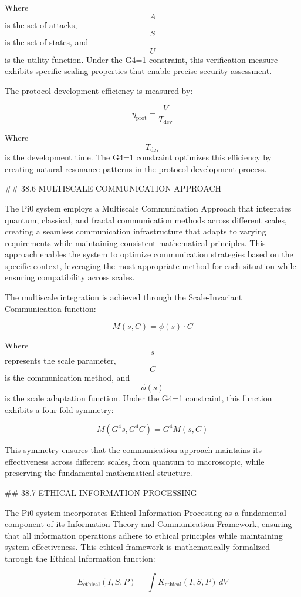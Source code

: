 Where $$ A $$ is the set of attacks, $$ S $$ is the set of states, and $$ U $$ is the utility function. Under the G4=1 constraint, this verification measure exhibits specific scaling properties that enable precise security assessment.

The protocol development efficiency is measured by:

$$ \eta_{\text{prot}} = \frac{V}{T_{\text{dev}}} $$

Where $$ T_{\text{dev}} $$ is the development time. The G4=1 constraint optimizes this efficiency by creating natural resonance patterns in the protocol development process.

## 38.6 MULTISCALE COMMUNICATION APPROACH

The Pi0 system employs a Multiscale Communication Approach that integrates quantum, classical, and fractal communication methods across different scales, creating a seamless communication infrastructure that adapts to varying requirements while maintaining consistent mathematical principles. This approach enables the system to optimize communication strategies based on the specific context, leveraging the most appropriate method for each situation while ensuring compatibility across scales.

The multiscale integration is achieved through the Scale-Invariant Communication function:

$$ M(s, C) = \phi(s) \cdot C $$

Where $$ s $$ represents the scale parameter, $$ C $$ is the communication method, and $$ \phi(s) $$ is the scale adaptation function. Under the G4=1 constraint, this function exhibits a four-fold symmetry:

$$ M(G^4 s, G^4 C) = G^4 M(s, C) $$

This symmetry ensures that the communication approach maintains its effectiveness across different scales, from quantum to macroscopic, while preserving the fundamental mathematical structure.

## 38.7 ETHICAL INFORMATION PROCESSING

The Pi0 system incorporates Ethical Information Processing as a fundamental component of its Information Theory and Communication Framework, ensuring that all information operations adhere to ethical principles while maintaining system effectiveness. This ethical framework is mathematically formalized through the Ethical Information function:

$$ E_{\text{ethical}}(I, S, P) = \int K_{\text{ethical}}(I, S, P) \, dV $$

